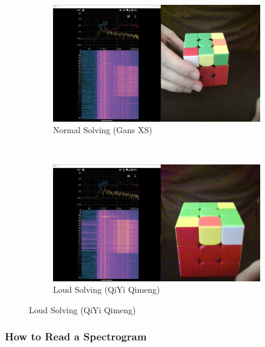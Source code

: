 \begin{figure}\ContinuedFloat
    \centering
    \begin{subfigure}{\textwidth}
        \centering
        \caption{Normal Solving (Gans XS)}
        \label{fig:signal-to-noise-ratio-xs}
        \includegraphics[width=\linewidth]{Figures/4 Protocol Design/Signal to Noise Ratio/xs_background_noise.jpg}
        \vspace*{2mm}
    \end{subfigure}\\
    \begin{subfigure}{\textwidth}
        \centering
        \caption{Loud Solving (QiYi Qimeng)}
        \label{fig:signal-to-noise-ratio-qiyi}
        \includegraphics[width=\linewidth]{Figures/4 Protocol Design/Signal to Noise Ratio/qiyi_background_noise.jpg}
        \vspace*{2mm}
    \end{subfigure}%
\end{figure}

\subsubsection{How to Read a Spectrogram}
\label{subsubsec:how-to-read-a-spectrogram}

